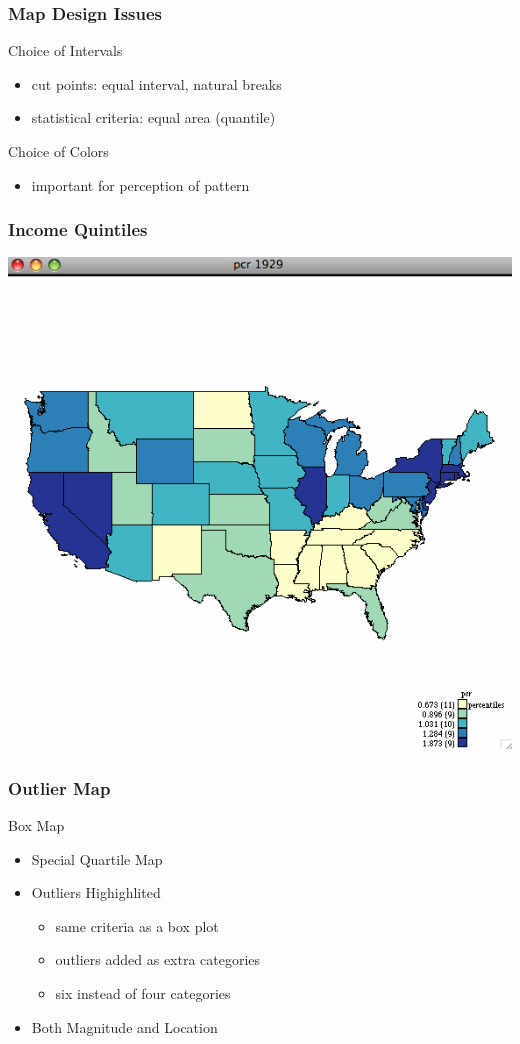 \documentclass[nototal]{beamer}
\begin{document}
\begin{frame}
	\frametitle{Map Design Issues}
 
\begin{block}{Choice of Intervals}
 \begin{itemize}
 \item  cut points: equal interval, natural breaks
 \item  statistical criteria: equal area (quantile)
 \end{itemize}
 \end{block} 
\begin{block}{Choice of Colors}
 \begin{itemize}
 \item  important for perception of pattern
 \end{itemize}
 \end{block} \end{frame} 

\begin{frame}
	\frametitle{Income Quintiles}
 \begin{center}
 \includegraphics[width=.65\linewidth]{income29.png}
  \end{center}
 \end{frame} 

\begin{frame}
	\frametitle{Outlier Map}
 
\begin{block}{Box Map}
 \begin{itemize}
 \item  Special Quartile Map
 \item  Outliers Highighlited
 \begin{itemize}
 \item  same  criteria as a box plot
 \item  outliers added as extra categories
 \item  six instead of four categories
 \end{itemize}
 \item  Both Magnitude and Location
 \end{itemize}
 \end{block} \end{frame} 
\end{document}
